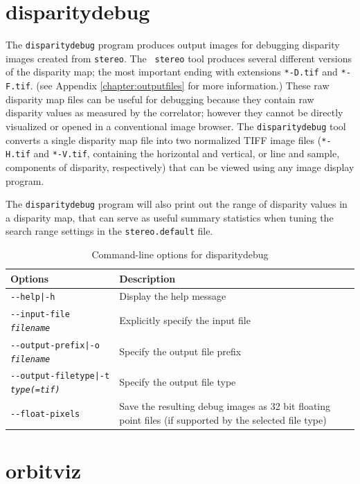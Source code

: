 \clearpage

\section{disparitydebug}
\label{disparitydebug}

The \texttt{disparitydebug} program produces output images for
debugging disparity images created from \verb#stereo#. The {\tt
stereo} tool produces several different versions of the disparity
map; the most important ending with extensions \verb#*-D.tif# and
\verb#*-F.tif#. (see Appendix \ref{chapter:outputfiles} for more
information.)  These raw disparity map files can be useful for
debugging because they contain raw disparity values as measured by
the correlator; however they cannot be directly visualized or opened
in a conventional image browser.  The \verb#disparitydebug# tool
converts a single disparity map file into two normalized TIFF image
files (\verb#*-H.tif# and \verb#*-V.tif#, containing the horizontal
and vertical, or line and sample, components of disparity, respectively)
that can be viewed using any image display program.

The {\tt disparitydebug} program will also print out the range of
disparity values in a disparity map, that can serve as useful summary
statistics when tuning the search range settings in the
{\tt stereo.default} file.

\begin{longtable}{|l|p{10cm}|}
\caption{Command-line options for disparitydebug}
\label{tbl:disparitydebug}
\endfirsthead
\endhead
\endfoot
\endlastfoot
\hline
Options & Description \\ \hline \hline
\texttt{-\/-help|-h} & Display the help message\\ \hline
\texttt{-\/-input-file \textit{filename}} & Explicitly specify the input file \\ \hline
\texttt{-\/-output-prefix|-o \textit{filename}} & Specify the output file prefix \\ \hline
\texttt{-\/-output-filetype|-t \textit{type(=tif)}} & Specify the output file type \\ \hline
\texttt{-\/-float-pixels} & Save the resulting debug images as 32 bit floating point files (if supported by the selected file type) \\ \hline
\end{longtable}

\section{orbitviz}
\label{orbitviz}

